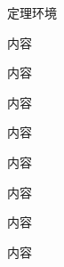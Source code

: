 \begin{frame}[allowframebreaks]{定理环境}
\begin{theorem}[标题]
内容
\end{theorem}
\begin{lemma}[标题]
内容
\end{lemma}
\begin{definition}[标题]
内容
\end{definition}
\begin{corollary}[标题]
内容
\end{corollary}
\begin{proposition}[标题]
内容
\end{proposition}
\begin{remark}[标题]
内容
\end{remark}
\begin{example}[标题]
内容
\end{example}
\begin{exercise}[标题]
内容
\end{exercise}
\end{frame}



